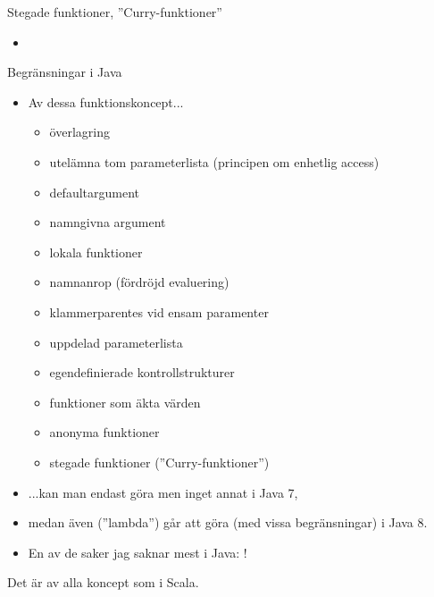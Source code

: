 \begin{Slide}{Stegade funktioner, ''Curry-funktioner''}
\begin{itemize}
\item 
\end{itemize}
\end{Slide} 


\begin{Slide}{Begränsningar i Java}\SlideFontSmall
\begin{itemize}
\item Av dessa funktionskoncept...
\begin{itemize}\SlideFontSmall
\item överlagring
\item utelämna tom parameterlista (principen om enhetlig access)
\item defaultargument
\item namngivna argument
\item lokala funktioner
\item namnanrop (fördröjd evaluering)
\item klammerparentes vid ensam paramenter
\item uppdelad parameterlista
\item egendefinierade kontrollstrukturer
\item funktioner som äkta värden
\item anonyma funktioner
\item stegade funktioner (''Curry-funktioner'')
\end{itemize}
\item ...kan man endast göra  men inget annat i Java 7, 
\item medan även  (''lambda'') går att göra (med vissa begränsningar) i Java 8.
\item En av de saker jag saknar mest i Java: !
\end{itemize}
Det är  av alla koncept som  i Scala.

\end{Slide} 




